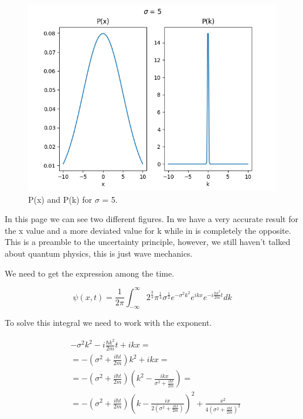 \begin{figure}[H]
    \centering
    \includegraphics{images2/P_x&P_k_sigma=5.png}
    \caption{P(x) and P(k) for $\sigma$ = 5.}
\end{figure}

In this page we can see two different figures. In  we have a very accurate result for the x value and a more deviated value for k while in  is completely the opposite. This is a preamble to the uncertainty principle, however, we still haven't talked about quantum physics, this is just wave mechanics.

We need to get the expression among the time.

\begin{equation}
    \label{2.32}
    \psi(x,t) = \frac{1}{2\pi}\int_{-\infty}^{\infty} 2^\frac{3}{4} \pi^\frac{1}{4} \sigma^\frac{1}{2} e^{-\sigma^2 k^2} e^{ikx} e^{-i\frac{\hbar k^2}{2m}t} dk
\end{equation}

To solve this integral we need to work with the exponent.

\begin{equation}
    \label{2.33}
    \begin{split}
        & - \sigma^2 k^2 - i \frac{\hbar k^2}{2m} t + ikx = \\
        & = - (\sigma^2 + \frac{i\hbar t}{2m})k^2 + ikx = \\
        & = - (\sigma^2 + \frac{i\hbar t}{2m}) (k^2 - \frac{ikx}{\sigma^2 + \frac{i\hbar t}{2m}}) = \\
        & = - (\sigma^2 + \frac{i\hbar t}{2m}) (k-\frac{ix}{2(\sigma^2 + \frac{i\hbar t}{2m})})^2 + \frac{x^2}{4(\sigma^2 + \frac{i\hbar t}{2m})^2}
    \end{split}
\end{equation}

